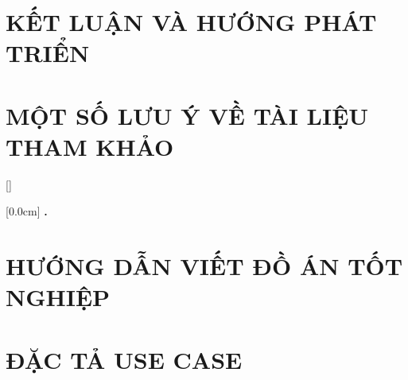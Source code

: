 \documentclass[a4paper,13pt,3p,twoside]{report}
\renewcommand{\bibname}{Danh_sach_tai_lieu_tham_khao}
\theoremstyle{definition}
\begin{document}
\chapter{KẾT LUẬN VÀ HƯỚNG PHÁT TRIỂN} %
\label{chapter:conclusion}


\newpage
\chapter*{MỘT SỐ LƯU Ý VỀ TÀI LIỆU THAM KHẢO} %
\label{chapter:reference}



\newpage
\renewcommand\bibname{TÀI LIỆU THAM KHẢO}
\printbibliography
{}

\appendixpage
\appendices
\addappheadtotoc


{}[]
\titlespacing*{\chapter}{0pt}{-20pt}{20pt}

    [0.0cm]             %
    {\bfseries\vspace{0.3cm}}                  %
    {{\bfseries{\scshape} \thecontentslabel.\ }} %
    {}         %
    {\contentspage}         %
\chapter{HƯỚNG DẪN VIẾT ĐỒ ÁN TỐT NGHIỆP}

\newpage
\chapter{ĐẶC TẢ USE CASE}

\end{document}
